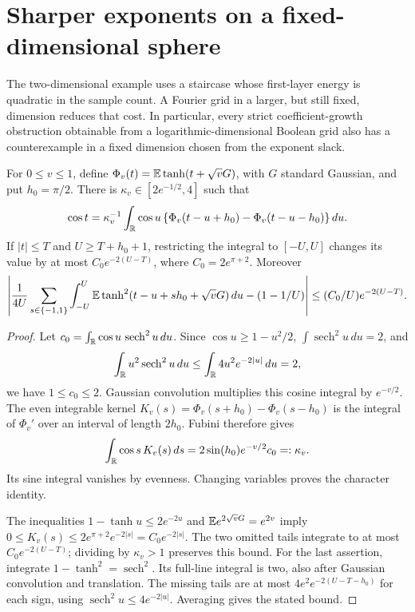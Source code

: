\section{Sharper exponents on a fixed-dimensional sphere}
\label{sec:fourier-fixed}
The two-dimensional example uses a staircase whose first-layer energy is quadratic in the sample count. A Fourier grid in a larger, but still fixed, dimension reduces that cost. In particular, every strict coefficient-growth obstruction obtainable from a logarithmic-dimensional Boolean grid also has a counterexample in a fixed dimension chosen from the exponent slack.

\begin{lemma}
\label{lem:fourier-convolution}
For $0\le v\le1$, define $\Phi_v(t)=\mathbb E\tanh(t+\sqrt vG)$, with $G$ standard Gaussian, and put $h_0=\pi/2$. There is $\kappa_v\in[2e^{-1/2},4]$ such that
\[
 \cos t=\kappa_v^{-1}\int_{\mathbb R}\cos u\,
       \{\Phi_v(t-u+h_0)-\Phi_v(t-u-h_0)\}\,du.
\]
If $|t|\le T$ and $U\ge T+h_0+1$, restricting the integral to $[-U,U]$ changes its value by at most $C_0e^{-2(U-T)}$, where $C_0=2e^{\pi+2}$. Moreover
\[
 \left|\frac1{4U}\sum_{s\in\{-1,1\}}\int_{-U}^U
        \mathbb E\tanh^2(t-u+sh_0+\sqrt vG)\,du
              -(1-1/U)\right|
 \le(C_0/U)e^{-2(U-T)}.
\]
\end{lemma}
\begin{proof}
Let $c_0=\int_{\mathbb R}\cos u\,\operatorname{sech}^2u\,du$. Since
$\cos u\ge1-u^2/2$, $\int\operatorname{sech}^2u\,du=2$, and
\[
 \int_{\mathbb R}u^2\operatorname{sech}^2u\,du
 \le\int_{\mathbb R}4u^2e^{-2|u|}\,du=2,
\]
we have $1\le c_0\le2$. Gaussian convolution multiplies this cosine integral by $e^{-v/2}$. The even integrable kernel
$K_v(s)=\Phi_v(s+h_0)-\Phi_v(s-h_0)$ is the integral of $\Phi_v'$ over an interval of length $2h_0$. Fubini therefore gives
\[
 \int_{\mathbb R}\cos s\,K_v(s)\,ds=2\sin(h_0)e^{-v/2}c_0=:\kappa_v.
\]
Its sine integral vanishes by evenness. Changing variables proves the character identity.

The inequalities $1-\tanh u\le2e^{-2u}$ and $\mathbb E e^{2\sqrt vG}=e^{2v}$ imply
$0\le K_v(s)\le2e^{\pi+2}e^{-2|s|}=C_0e^{-2|s|}$.
The two omitted tails integrate to at most $C_0e^{-2(U-T)}$; dividing by $\kappa_v>1$ preserves this bound.
For the last assertion, integrate $1-\tanh^2=\operatorname{sech}^2$. Its full-line integral is two, also after Gaussian convolution and translation. The missing tails are at most $4e^2e^{-2(U-T-h_0)}$ for each sign, using $\operatorname{sech}^2 u\le4e^{-2|u|}$. Averaging gives the stated bound.
\end{proof}

